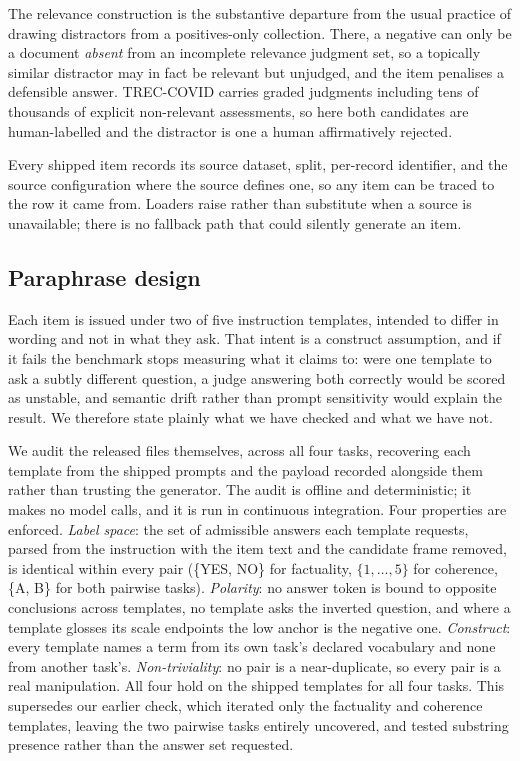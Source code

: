 The relevance construction is the substantive departure from the usual practice
of drawing distractors from a positives-only collection. There, a negative can
only be a document \emph{absent} from an incomplete relevance judgment set, so a
topically similar distractor may in fact be relevant but unjudged, and the item
penalises a defensible answer. TREC-COVID carries graded judgments including
tens of thousands of explicit non-relevant assessments, so here both candidates
are human-labelled and the distractor is one a human affirmatively rejected.

Every shipped item records its source dataset, split, per-record identifier, and
the source configuration where the source defines one, so any item can be traced
to the row it came from.
Loaders raise rather than substitute when a source is unavailable; there is no
fallback path that could silently generate an item.

\subsection{Paraphrase design}

Each item is issued under two of five instruction templates, intended to differ
in wording and not in what they ask. That intent is a construct assumption, and
if it fails the benchmark stops measuring what it claims to: were one template
to ask a subtly different question, a judge answering both correctly would be
scored as unstable, and semantic drift rather than prompt sensitivity would
explain the result. We therefore state plainly what we have checked and what we
have not.

We audit the released files themselves, across all four tasks, recovering each
template from the shipped prompts and the payload recorded alongside them rather
than trusting the generator. The audit is offline and deterministic;
it makes no model calls, and it is run in continuous integration. Four
properties are enforced. \emph{Label space}: the set of admissible answers each
template requests, parsed from the instruction with the item text and the
candidate frame removed, is identical within every pair (\{YES, NO\} for
factuality, $\{1,\dots,5\}$ for coherence, \{A, B\} for both pairwise tasks).
\emph{Polarity}: no answer token is bound to opposite conclusions across
templates, no template asks the inverted question, and where a template glosses
its scale endpoints the low anchor is the negative one. \emph{Construct}: every
template names a term from its own task's declared vocabulary and none from
another task's. \emph{Non-triviality}: no pair is a near-duplicate, so every
pair is a real manipulation. All four hold on the shipped templates for all four
tasks. This supersedes our earlier check, which iterated only the factuality and
coherence templates, leaving the two pairwise tasks entirely uncovered, and
tested substring presence rather than the answer set requested.

